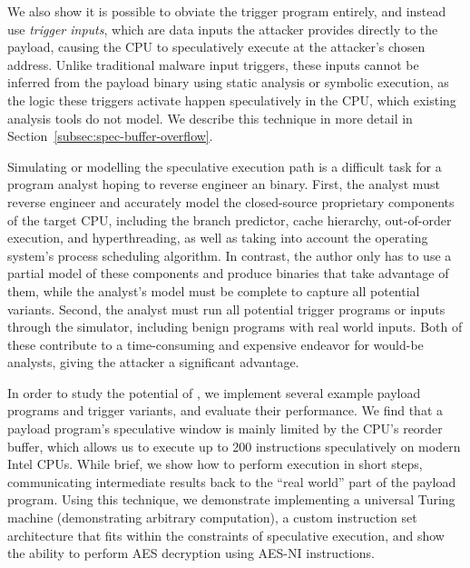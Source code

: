 
We also show it is possible to obviate the trigger program entirely, and
instead use \emph{trigger inputs}, which are data inputs the attacker provides
directly to
the payload, causing the CPU to speculatively execute
at the attacker's chosen address. Unlike traditional malware input triggers, these inputs
cannot be inferred from the payload binary using static analysis or symbolic
execution, as the logic these triggers activate happen speculatively in the
CPU, which existing analysis tools do not model. We describe this technique in
more detail in Section~\ref{subsec:spec-buffer-overflow}.

Simulating or modelling the speculative execution path is a difficult task for a
program analyst hoping to reverse engineer an \speculake binary. First, the
analyst must reverse engineer and accurately model the closed-source proprietary
components of the target CPU, including the branch predictor, cache hierarchy,
out-of-order execution, and hyperthreading, as well as taking into account the
operating system's process scheduling algorithm. In contrast, the \speculake
author only has to use a partial model of these components and produce binaries
that take advantage of them, while the analyst's model must be complete to
capture all potential \speculake variants. Second, the analyst must run all
potential trigger programs or inputs through the simulator, including benign
programs with real world inputs. Both of these contribute to a time-consuming and expensive
endeavor for would-be analysts, giving the attacker a significant advantage.

In order to study the potential of \speculake, we implement several example
payload programs and trigger variants, and evaluate their performance. We find
that a payload program's speculative
window is mainly limited by the CPU's reorder buffer, which
allows us to execute up to 200 instructions speculatively on modern
Intel CPUs. While brief, we show how to perform execution in short steps,
communicating intermediate results back to the ``real world'' part of the
payload program. Using this technique, we demonstrate implementing a universal
Turing machine (demonstrating arbitrary computation), a custom instruction set
architecture that fits within the constraints of speculative execution, and show
the ability to perform AES decryption using AES-NI instructions.

